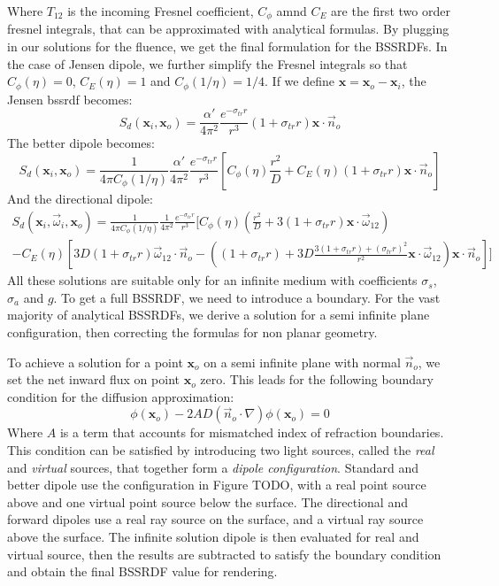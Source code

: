 Where $T_{12}$ is the incoming Fresnel coefficient, $C_\phi$ amnd $C_E$ are the first two order fresnel integrals, that can be approximated with analytical formulas. By plugging in our solutions for the fluence, we get the final formulation for the BSSRDFs. In the case of Jensen dipole, we further simplify the Fresnel integrals so that $C_\phi(\eta) = 0$, $C_E(\eta) = 1$ and $C_\phi(1/\eta) = 1/4$. If we define $\mathbf{x} = \mathbf{x}_o - \mathbf{x}_i$, the Jensen bssrdf becomes:
\begin{equation*}
S_d(\mathbf{x}_i, \mathbf{x}_o)  =  \frac{\alpha'}{4 \pi^2} \frac{e^{-\sigma_{tr} r}}{r^3} (1 + \sigma_{tr} r) \mathbf{x} \cdot \vec{n}_o 
\end{equation*}
The better dipole becomes:
\begin{equation*}
S_d(\mathbf{x}_i, \mathbf{x}_o)  = \frac{1}{4\pi C_\phi(1/\eta)} \frac{\alpha'}{4 \pi^2} \frac{e^{-\sigma_{tr} r}}{r^3} \left[ C_\phi(\eta) \frac{r^2}{D} + C_E(\eta) (1 + \sigma_{tr} r) \mathbf{x} \cdot \vec{n}_o \right]
\end{equation*}
And the directional dipole:
\begin{multline*}
S_d(\mathbf{x}_i, \vec{\omega}_i, \mathbf{x}_o)  = \frac{1}{4\pi C_\phi(1/\eta)} \frac{1}{4 \pi^2} \frac{e^{-\sigma_{tr} r}}{r^3} \bigg[ C_\phi(\eta) (\frac{r^2}{D} +  3 (1 + \sigma_{tr} r) \mathbf{x}\cdot\vec{\omega}_{12} ) \\ - C_E(\eta) \left[3D (1 + \sigma_{tr} r) \vec{\omega}_{12} \cdot \vec{n}_o - \left((1 + \sigma_{tr} r) + 3D \frac{3 (1 + \sigma_{tr} r)  + (\sigma_{tr} r)^2}{r^2}\mathbf{x}\cdot\vec{\omega}_{12}\right) \mathbf{x} \cdot \vec{n}_o\right] \bigg]
\end{multline*}
All these solutions are suitable only for an infinite medium with coefficients $\sigma_s$, $\sigma_a$ and $g$. To get a full BSSRDF, we need to introduce a boundary. For the vast majority of analytical BSSRDFs, we derive a solution for a semi infinite plane configuration, then correcting the formulas for non planar geometry. 



To achieve a solution for a point $\mathbf{x}_o$ on a semi infinite plane with normal $\vec{n}_o$, we set the net inward flux on point $\mathbf{x}_o$ zero. This leads for the following boundary condition for the diffusion approximation: 
\begin{equation*}
\phi(\mathbf{x}_o) - 2 A D (\vec{n}_o \cdot \nabla) \phi(\mathbf{x}_o) = 0
\end{equation*}
Where $A$ is a term that accounts for mismatched index of refraction boundaries. This condition can be satisfied by introducing two light sources, called the \emph{real} and \emph{virtual} sources, that together form a \emph{dipole configuration}. Standard and better dipole use the configuration in Figure TODO, with a real point source above and one virtual point source below the surface. The directional and forward dipoles use a real ray source on the surface, and a virtual ray source above the surface. The infinite solution dipole is then evaluated for real and virtual source, then the results are subtracted to satisfy the boundary condition and obtain the final BSSRDF value for rendering. 

